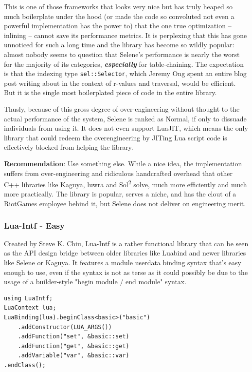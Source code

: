 \documentclass[conference,compsoc]{IEEEtran}
\newcommand{\soltwo}{Sol\textsuperscript{2}}
\begin{document}
This is one of those frameworks that looks very nice but has truly heaped so much boilerplate under the hood (or made the code so convoluted not even a powerful implementation has the power to) that the one true optimization -- inlining -- cannot save its performance metrics. It is perplexing that this has gone unnoticed for such a long time and the library has become so wildly popular: almost nobody seems to question that Selene's performance is nearly the worst for the majority of its categories, \emph{\textbf{especially}} for table-chaining. The expectation is that the indexing type \lstinline|sel::Selector|, which Jeremy Ong spent an entire blog post writing about in the context of r-values and traversal, would be efficient. But it is the single most boilerplated piece of code in the entire library.

Thusly, because of this gross degree of over-engineering without thought to the actual performance of the system, Selene is ranked as Normal, if only to dissuade individuals from using it. It does not even support LuaJIT, which means the only library that could redeem the overengineering by JITing Lua script code is effectively blocked from helping the library.

\textbf{Recommendation}: Use something else. While a nice idea, the implementation suffers from over-engineering and ridiculous handcrafted overhead that other C++ libraries like Kaguya, luwra and \soltwo{} solve, much more efficiently and much more practically. The library is popular, serves a niche, and has the clout of a RiotGames employee behind it, but Selene does not deliver on engineering merit.

\subsubsection{Lua-Intf - Easy}\label{sssec:lua-intf}

Created by Steve K. Chiu, Lua-Intf\cite{lua-intf} is a rather functional library that can be seen as the API design bridge between older libraries like Luabind and newer libraries like Selene or Kaguya. It features a module userdata binding syntax that's easy enough to use, even if the syntax is not as terse as it could possibly be due to the usage of a builder-style "begin module / end module" syntax.

\begin{lstlisting}[caption={Binding the basic example from \cref{lst:basic-code}} in Lua-Intf,
label={lst:lua-intf-binding}]
using LuaIntf;
LuaContext lua;
LuaBinding(lua).beginClass<basic>("basic")
	.addConstructor(LUA_ARGS())
	.addFunction("set", &basic::set)
	.addFunction("get", &basic::get)
	.addVariable("var", &basic::var)
.endClass();
\end{lstlisting}
\end{document}
